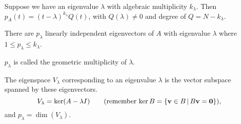 \documentclass[10pt, a4paper]{article}
\begin{document}
\begin{remark}
    Suppose we have an eigenvalue $\lambda$ with algebraic multiplicity $k_{\lambda}$.
    Then $p_A(t) = (t - \lambda) ^ {k_\lambda}Q(t)$,
    with $Q(\lambda) \neq 0$ and degree of $Q = N - k_{\lambda}$.
\end{remark}

\begin{proposition}
    There are $p_{\lambda}$ linearly independent eigenvectors of $A$ with eigenvalue $\lambda$ where $1 \leq p_{\lambda} \leq k_{\lambda}$.
    
    $p_{\lambda}$ is called the geometric multiplicity of $\lambda$.
\end{proposition}

\begin{definition}[Eigenspace]
    The eigenspace $V_{\lambda}$ corresponding to an eigenvalue $\lambda$ is the vector subspace spanned by these eigenvectors.
    \[
    V_{\lambda} = \ker(A - \lambda I)\qquad\text{(remember $\ker{B} = \left\{\mathbf{v} \in B\,\middle|\, B\mathbf{v} = \mathbf{0}\right\}$)},
    \]
    and $p_{\lambda} = \dim(V_{\lambda})$.
\end{definition}
\end{document}
